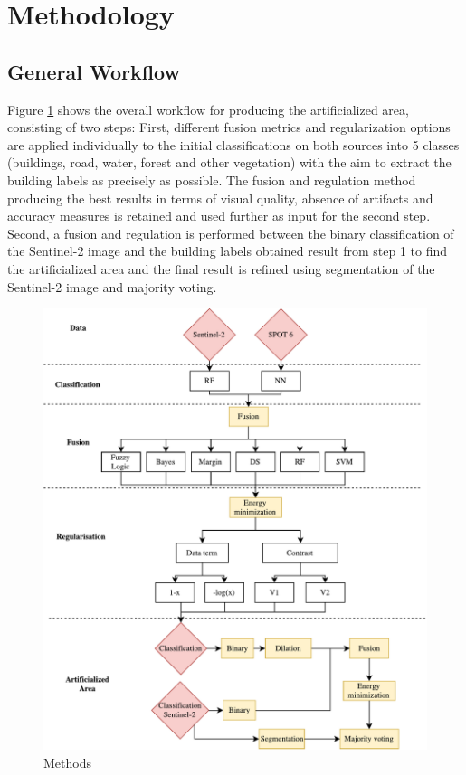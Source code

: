\documentclass[10pt]{article}
\begin{document}
\section{Methodology}\label{sec:method}
\subsection{General Workflow}
Figure \ref{fig:methods} shows the overall workflow for producing the artificialized area, consisting of two steps: First, different fusion metrics and regularization options are applied individually to the initial classifications on both sources into 5 classes (buildings, road, water, forest and other vegetation) with the aim to extract the building labels as precisely as possible. The fusion and regulation method producing the best results in terms of visual quality, absence of artifacts and accuracy measures is retained and used further as input for the second step. Second, a fusion and regulation is performed between the binary classification of the Sentinel-2 image and the building labels obtained result from step 1 to find the artificialized area and the final result is refined using segmentation of the Sentinel-2 image and majority voting.

\begin{figure}[H]
    \centering
    \includegraphics[width=.7\textwidth]{IGN-methods}
    \caption{Methods}
    \label{fig:methods}
\end{figure}

\end{document}
